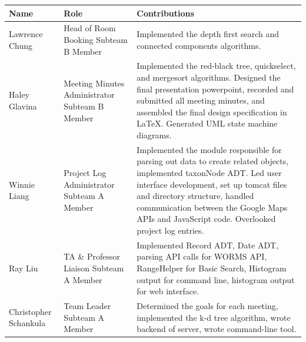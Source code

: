 \documentclass{article}
\begin{document}
\begin{table}[h]
	\centering
	\begin{tabular}{p{0.16\hsize}p{0.38\hsize}p{0.38\hsize}}
		\toprule
		\textbf{Name} & \textbf{Role} & \textbf{Contributions}\\
		\midrule
		Lawrence Chung
		& Head of Room Booking \newline Subteam B Member
		& Implemented the depth first search and connected components algorithms. \\
		\midrule
		Haley Glavina
		& Meeting Minutes Administrator \newline Subteam B Member
		& Implemented the red-black tree, quickselect, and mergesort algorithms. Designed the final presentation powerpoint, recorded and submitted all meeting minutes, and assembled the final design specification in LaTeX. Generated UML state machine diagrams.\\
		\midrule
		Winnie Liang
		& Project Log Administrator \newline Subteam A Member
		& Implemented the module responsible for parsing out data to create related objects, implemented taxonNode ADT. Led user interface development, set up tomcat files and directory structure,  handled communication between the Google Maps APIs and JavaScript code. Overlooked project log entries.\\
		\midrule
		Ray Liu
		& TA \& Professor Liaison \newline Subteam A Member
		& Implemented Record ADT, Date ADT, parsing API calls for WORMS API, RangeHelper for Basic Search, Histogram output for command line, histogram output for web interface.\\
		\midrule
		Christopher Schankula
		& Team Leader \newline Subteam A Member
		& Determined the goals for each meeting, implemented the k-d tree algorithm, wrote backend of server, wrote command-line tool. \\		
		\bottomrule
	\end{tabular}
\end{table}


\newpage
\end{document}
